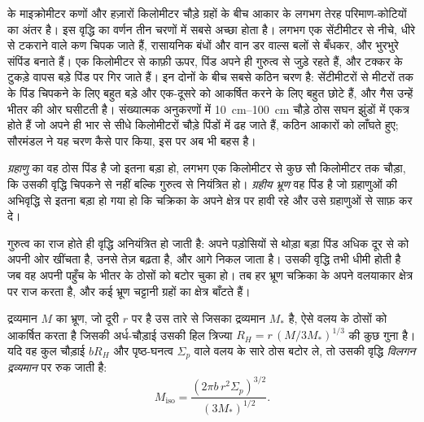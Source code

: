  के माइक्रोमीटर कणों और हज़ारों किलोमीटर चौड़े ग्रहों के बीच
आकार के लगभग तेरह परिमाण-कोटियों का अंतर है। इस वृद्धि का वर्णन
तीन चरणों में सबसे अच्छा होता है। लगभग एक सेंटीमीटर से नीचे, धीरे से टकराने वाले कण
चिपक जाते हैं, रासायनिक बंधों और वान डर वाल्स बलों से बँधकर, और भुरभुरे
संपिंड बनाते हैं। एक किलोमीटर से काफ़ी ऊपर, पिंड अपने ही गुरुत्व से जुड़े रहते हैं,
और टक्कर के टुकड़े वापस बड़े पिंड पर गिर जाते हैं। इन दोनों के बीच
सबसे कठिन चरण है: सेंटीमीटरों से मीटरों तक के पिंड चिपकने के लिए बहुत बड़े
और एक-दूसरे को आकर्षित करने के लिए बहुत छोटे हैं, और गैस उन्हें भीतर की ओर घसीटती है।
संख्यात्मक अनुकरणों में \qtyrange{10}{100}{cm} चौड़े ठोस सघन
झुंडों में एकत्र होते हैं जो अपने ही भार से सीधे किलोमीटरों चौड़े पिंडों में
ढह जाते हैं, कठिन आकारों को लाँघते हुए; सौरमंडल ने यह चरण कैसे पार किया,
इस पर अब भी बहस है।

\begin{definition}[ग्रहाणु, ग्रहीय भ्रूण]
\label{def:b2:planet-formation-meteorites:planetesimal}
\emph{ग्रहाणु}  का वह ठोस पिंड है जो
इतना बड़ा हो, लगभग एक किलोमीटर से कुछ सौ किलोमीटर तक चौड़ा, कि
उसकी वृद्धि चिपकने से नहीं बल्कि गुरुत्व से नियंत्रित हो।
\emph{ग्रहीय भ्रूण} वह पिंड है जो ग्रहाणुओं की
अभिवृद्धि से इतना बड़ा हो गया हो कि चक्रिका के अपने क्षेत्र पर हावी रहे और
उसे ग्रहाणुओं से साफ़ कर दे।
\end{definition}

गुरुत्व का राज होते ही वृद्धि अनियंत्रित हो जाती है: अपने पड़ोसियों से थोड़ा बड़ा पिंड
अधिक दूर से  को अपनी ओर खींचता है, उनसे तेज़ बढ़ता है,
और आगे निकल जाता है। उसकी वृद्धि तभी धीमी होती है जब वह अपनी पहुँच के भीतर के
ठोसों को बटोर चुका हो। तब हर भ्रूण चक्रिका के अपने वलयाकार क्षेत्र पर राज करता है,
और कई भ्रूण चट्टानी ग्रहों का क्षेत्र बाँटते हैं।

\begin{proposition}[विलगन द्रव्यमान]\label{prop:b2:planet-formation-meteorites:isolation}
द्रव्यमान $M$ का भ्रूण, जो दूरी $r$ पर है उस तारे से जिसका द्रव्यमान $M_*$ है,
ऐसे वलय के ठोसों को आकर्षित करता है जिसकी अर्ध-चौड़ाई उसकी हिल त्रिज्या
$R_H = r\,(M/3M_*)^{1/3}$ की कुछ गुना है। यदि वह कुल चौड़ाई
$bR_H$ और पृष्ठ-घनत्व $\Sigma_p$ वाले वलय के सारे ठोस बटोर ले, तो उसकी वृद्धि
\emph{विलगन द्रव्यमान} पर रुक जाती है:
\[
  M_{\mathrm{iso}} = \frac{(2\pi b\, r^2 \Sigma_p)^{3/2}}{(3M_*)^{1/2}} .
\]
\end{proposition}

